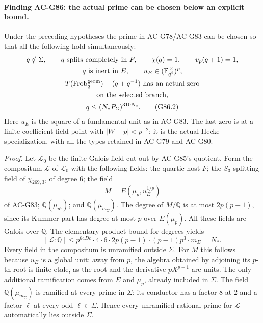 \paragraph{Finding AC-G86: the actual prime can be chosen below an explicit bound.}
Under the preceding hypotheses the prime in AC-G78/AC-G83 can be chosen so that all the following hold simultaneously:
\[
 \begin{gathered}
 q\notin\Sigma,\qquad q\text{ splits completely in }F,\qquad
 \chi(q)=1,\qquad v_p(q+1)=1,\\
 q\text{ is inert in }E,\qquad
 u_E\in(\mathbb F_{q^2}^{\,\times})^p,\\
 T(\operatorname{Frob}^{\rm geom}_q)-(q+q^{-1})
       \text{ has an actual zero}\\
       \text{on the selected branch},\\
 q\leq (N_*P_\Sigma)^{310N_*}. \tag{G86.2}
 \end{gathered}
\]
Here \(u_E\) is the square of a fundamental unit as in AC-G83. The last zero is at a finite coefficient-field point with \(|W-p|<p^{-2}\); it is the actual Hecke specialization, with all the types retained in AC-G79 and AC-G80.

\emph{Proof.}
Let \(\mathcal L_0\) be the finite Galois field cut out by AC-G85's quotient. Form the compositum \(\mathcal L\) of \(\mathcal L_0\) with the following fields: the quartic host \(F\); the \(S_3\)-splitting field of \(\chi_{269,3}\), of degree \(6\); the field
\[
 M=E(\mu_p,u_E^{1/p})
\]
of AC-G83; \(\mathbb Q(\mu_{p^4})\); and \(\mathbb Q(\mu_{m_\Sigma})\).
The degree of \(M/\mathbb Q\) is at most \(2p(p-1)\), since its Kummer part has degree at most \(p\) over \(E(\mu_p)\). All these fields are Galois over \(\mathbb Q\). The elementary product bound for degrees yields
\[
 [\mathcal L:\mathbb Q]
 \leq p^{64Dc}\cdot4\cdot6\cdot2p(p-1)
          \cdot(p-1)p^3\cdot m_\Sigma
 =N_*.
\]
Every field in the compositum is unramified outside \(\Sigma\). For \(M\) this follows because \(u_E\) is a global unit: away from \(p\), the algebra obtained by adjoining its \(p\)-th root is finite etale, as the root and the derivative \(pX^{p-1}\) are units. The only additional ramification comes from \(E\) and \(\mu_p\), already included in \(\Sigma\). The field \(\mathbb Q(\mu_{m_\Sigma})\) is ramified at every prime in \(\Sigma\): its conductor has a factor \(8\) at \(2\) and a factor \(\ell\) at every odd \(\ell\in\Sigma\). Hence every unramified rational prime for \(\mathcal L\) automatically lies outside \(\Sigma\).

